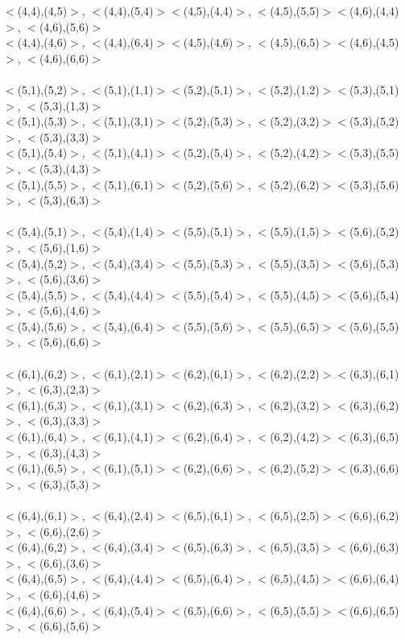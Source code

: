 \documentclass{article}
\begin{document}
\begin{enumerate}
$<$(4,4),(4,5)$>$, $<$(4,4),(5,4)$>$\qquad	$<$(4,5),(4,4)$>$, $<$(4,5),(5,5)$>$\qquad	$<$(4,6),(4,4)$>$, $<$(4,6),(5,6)$>$\\
$<$(4,4),(4,6)$>$, $<$(4,4),(6,4)$>$\qquad	$<$(4,5),(4,6)$>$, $<$(4,5),(6,5)$>$\qquad	$<$(4,6),(4,5)$>$, $<$(4,6),(6,6)$>$\\
\\
$<$(5,1),(5,2)$>$, $<$(5,1),(1,1)$>$\qquad	$<$(5,2),(5,1)$>$, $<$(5,2),(1,2)$>$\qquad	$<$(5,3),(5,1)$>$, $<$(5,3),(1,3)$>$\\
$<$(5,1),(5,3)$>$, $<$(5,1),(3,1)$>$\qquad	$<$(5,2),(5,3)$>$, $<$(5,2),(3,2)$>$\qquad	$<$(5,3),(5,2)$>$, $<$(5,3),(3,3)$>$\\
$<$(5,1),(5,4)$>$, $<$(5,1),(4,1)$>$\qquad	$<$(5,2),(5,4)$>$, $<$(5,2),(4,2)$>$\qquad	$<$(5,3),(5,5)$>$, $<$(5,3),(4,3)$>$\\
$<$(5,1),(5,5)$>$, $<$(5,1),(6,1)$>$\qquad	$<$(5,2),(5,6)$>$, $<$(5,2),(6,2)$>$\qquad	$<$(5,3),(5,6)$>$, $<$(5,3),(6,3)$>$\\
\\
$<$(5,4),(5,1)$>$, $<$(5,4),(1,4)$>$\qquad	$<$(5,5),(5,1)$>$, $<$(5,5),(1,5)$>$\qquad	$<$(5,6),(5,2)$>$, $<$(5,6),(1,6)$>$\\
$<$(5,4),(5,2)$>$, $<$(5,4),(3,4)$>$\qquad	$<$(5,5),(5,3)$>$, $<$(5,5),(3,5)$>$\qquad	$<$(5,6),(5,3)$>$, $<$(5,6),(3,6)$>$\\
$<$(5,4),(5,5)$>$, $<$(5,4),(4,4)$>$\qquad	$<$(5,5),(5,4)$>$, $<$(5,5),(4,5)$>$\qquad	$<$(5,6),(5,4)$>$, $<$(5,6),(4,6)$>$\\
$<$(5,4),(5,6)$>$, $<$(5,4),(6,4)$>$\qquad	$<$(5,5),(5,6)$>$, $<$(5,5),(6,5)$>$\qquad	$<$(5,6),(5,5)$>$, $<$(5,6),(6,6)$>$\\
\\
$<$(6,1),(6,2)$>$, $<$(6,1),(2,1)$>$\qquad	$<$(6,2),(6,1)$>$, $<$(6,2),(2,2)$>$\qquad	$<$(6,3),(6,1)$>$, $<$(6,3),(2,3)$>$\\
$<$(6,1),(6,3)$>$, $<$(6,1),(3,1)$>$\qquad	$<$(6,2),(6,3)$>$, $<$(6,2),(3,2)$>$\qquad	$<$(6,3),(6,2)$>$, $<$(6,3),(3,3)$>$\\
$<$(6,1),(6,4)$>$, $<$(6,1),(4,1)$>$\qquad	$<$(6,2),(6,4)$>$, $<$(6,2),(4,2)$>$\qquad	$<$(6,3),(6,5)$>$, $<$(6,3),(4,3)$>$\\
$<$(6,1),(6,5)$>$, $<$(6,1),(5,1)$>$\qquad	$<$(6,2),(6,6)$>$, $<$(6,2),(5,2)$>$\qquad	$<$(6,3),(6,6)$>$, $<$(6,3),(5,3)$>$\\
\\
$<$(6,4),(6,1)$>$, $<$(6,4),(2,4)$>$\qquad	$<$(6,5),(6,1)$>$, $<$(6,5),(2,5)$>$\qquad	$<$(6,6),(6,2)$>$, $<$(6,6),(2,6)$>$\\
$<$(6,4),(6,2)$>$, $<$(6,4),(3,4)$>$\qquad	$<$(6,5),(6,3)$>$, $<$(6,5),(3,5)$>$\qquad	$<$(6,6),(6,3)$>$, $<$(6,6),(3,6)$>$\\
$<$(6,4),(6,5)$>$, $<$(6,4),(4,4)$>$\qquad	$<$(6,5),(6,4)$>$, $<$(6,5),(4,5)$>$\qquad	$<$(6,6),(6,4)$>$, $<$(6,6),(4,6)$>$\\
$<$(6,4),(6,6)$>$, $<$(6,4),(5,4)$>$\qquad	$<$(6,5),(6,6)$>$, $<$(6,5),(5,5)$>$\qquad	$<$(6,6),(6,5)$>$, $<$(6,6),(5,6)$>$\\
\end{enumerate}
\end{document}
